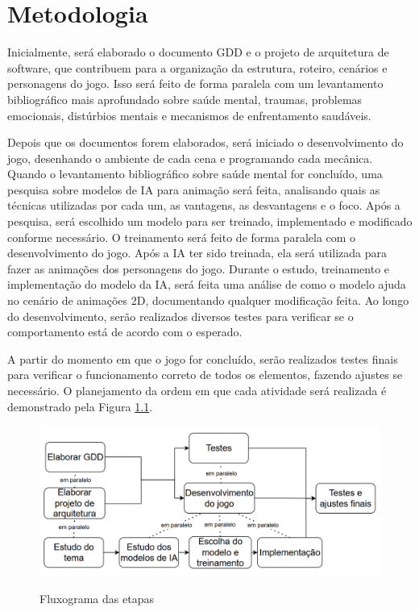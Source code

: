 \chapter{Metodologia}
\label{c.metodologia}


Inicialmente, será elaborado o documento GDD e o projeto de arquitetura de software, que contribuem para a organização da estrutura, roteiro, cenários e personagens do jogo. Isso será feito de forma paralela com um levantamento bibliográfico mais aprofundado sobre saúde mental, traumas, problemas emocionais, distúrbios mentais e mecanismos de enfrentamento saudáveis.

Depois que os documentos forem elaborados, será iniciado o desenvolvimento do jogo, desenhando o ambiente de cada cena e programando cada mecânica. Quando o levantamento bibliográfico sobre saúde mental for concluído, uma pesquisa sobre modelos de IA para animação será feita, analisando quais as técnicas utilizadas por cada um, as vantagens, as desvantagens e o foco. Após a pesquisa, será escolhido um modelo para ser treinado, implementado e modificado conforme necessário. O treinamento será feito de forma paralela com o desenvolvimento do jogo. Após a IA ter sido treinada, ela será utilizada para fazer as animações dos personagens do jogo. Durante o estudo, treinamento e implementação do modelo da IA, será feita uma análise de como o modelo ajuda no cenário de animações 2D, documentando qualquer modificação feita. Ao longo do desenvolvimento, serão realizados diversos testes para verificar se o comportamento está de acordo com o esperado. 

A partir do momento em que o jogo for concluído, serão realizados testes finais para verificar o funcionamento correto de todos os elementos, fazendo ajustes se necessário. O planejamento da ordem em que cada atividade será realizada é demonstrado pela Figura \ref{f.Diagrama}.

\begin{figure}[htbp]
	\caption{\small Fluxograma das etapas}
	\centering
	\includegraphics[width=1\linewidth]{figs/Diagrama.PNG}
	\label{f.Diagrama}
\end{figure}

